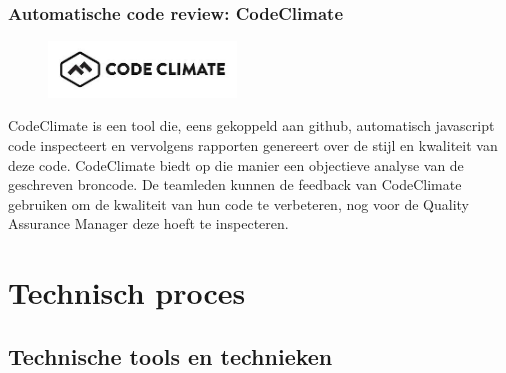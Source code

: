 \documentclass{article}
\begin{document}
 
 \subsubsection*{Automatische code review: CodeClimate}

\begin{figure}[h!]
\centering
 \includegraphics[width=50mm]{codeClimate.jpg}
\end{figure}

\noindent CodeClimate is een tool die, eens gekoppeld aan github, automatisch javascript code inspecteert en vervolgens rapporten genereert over de stijl en kwaliteit van deze code. CodeClimate biedt op die manier een objectieve analyse van de geschreven broncode. De teamleden kunnen de feedback van CodeClimate gebruiken om de kwaliteit van hun code te verbeteren, nog voor de Quality Assurance Manager deze hoeft te inspecteren.  

 
\clearpage
 
 

\section{Technisch proces}

\subsection{Technische tools en technieken}
\end{document}

